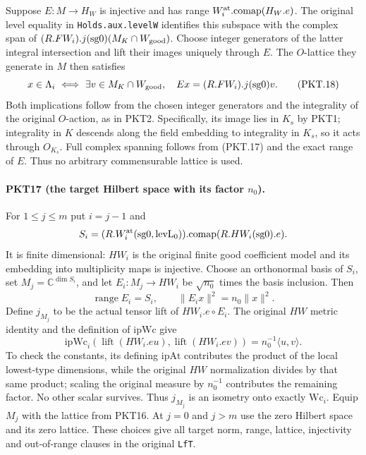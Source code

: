 Suppose $E:M\to H_W$ is injective and has range
$W^{\rm at}_i.\mathrm{comap}(H_W.e)$.  The original level equality in
\texttt{Holds.aux.levelW} identifies this subspace with the complex span
of $(R.FW_i).j(\mathrm{sg0})(M_K\cap W_{\rm good})$.  Choose integer
generators of the latter integral intersection and lift their images
uniquely through $E$.  The $O$-lattice they generate in $M$ then satisfies
\[
 x\in\Lambda_i\ \Longleftrightarrow\
 \exists v\in M_K\cap W_{\rm good},\quad
 E x=(R.FW_i).j(\mathrm{sg0})v.\tag{PKT.18}
\]
Both implications follow from the chosen integer generators and the
integrality of the original $O$-action, as in PKT2.  Specifically, its
image lies in $K_s$ by PKT1; integrality in $K$ descends along the
field embedding to integrality in $K_s$, so it acts through $O_{K_s}$.
Full complex spanning
follows from (PKT.17) and the exact range of $E$.  Thus no arbitrary
commensurable lattice is used.

\paragraph{PKT17 (the target Hilbert space with its factor $n_0$).}\label{claim:PKT17}
For $1\le j\le m$ put $i=j-1$ and
\[
 S_i=(R.W^{\rm at}_i(\mathrm{sg0},\mathrm{levL}_0))
                   .\mathrm{comap}(R.HW_i(\mathrm{sg0}).e).
\]
It is finite dimensional: $HW_i$ is the original finite good coefficient
model and its embedding into multiplicity maps is injective.  Choose an
orthonormal basis of $S_i$, set $M_j=\mathbb C^{\dim S_i}$, and let
$E_i:M_j\to HW_i$ be $\sqrt{n_0}$ times the basis inclusion.  Then
\[
 \operatorname{range}E_i=S_i,\qquad
 \|E_i x\|^2=n_0\|x\|^2.\tag{PKT.19}
\]
Define $j_{M_j}$ to be the actual tensor lift of $HW_i.e\circ E_i$.
The original $HW$ metric identity and the definition of $\mathrm{ipWc}$
give
\[
 \mathrm{ipWc}_i(\operatorname{lift}(HW_i.eu),
                   \operatorname{lift}(HW_i.ev))
       =n_0^{-1}\langle u,v\rangle.\tag{PKT.20}
\]
To check the constants, its defining $\mathrm{ipAt}$ contributes the
product of the local lowest-type dimensions, while the original $HW$
normalization divides by that same product; scaling the original measure
by $n_0^{-1}$ contributes the remaining factor.  No other scalar survives.
Thus $j_{M_j}$ is an isometry onto exactly $\mathrm{Wc}_i$.  Equip $M_j$
with the lattice from PKT16.  At $j=0$ and $j>m$ use the zero Hilbert
space and its zero lattice.  These choices give all target norm, range,
lattice, injectivity and out-of-range clauses in the original \texttt{LfT}.

